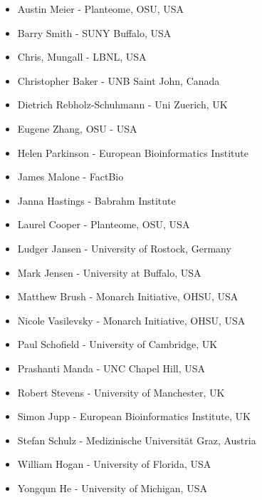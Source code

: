 \documentclass{article}
\begin{document}
\begin{itemize}
\item Austin Meier - Planteome, OSU, USA 
\item Barry Smith - SUNY Buffalo, USA 
\item Chris, Mungall - LBNL, USA 
\item Christopher Baker - UNB Saint John, Canada
\item Dietrich Rebholz-Schuhmann - Uni Zuerich, UK
\item Eugene Zhang, OSU - USA 
\item Helen Parkinson - European Bioinformatics Institute 
\item James Malone - FactBio
\item Janna Hastings - Babrahm Institute 
\item Laurel Cooper - Planteome, OSU, USA
\item Ludger Jansen - University of Rostock, Germany 
\item Mark Jensen - University at Buffalo, USA
\item Matthew Brush - Monarch Initiative, OHSU, USA 
\item Nicole Vasilevsky - Monarch Initiative, OHSU, USA 
\item Paul Schofield - University of Cambridge, UK 
\item Prashanti Manda - UNC Chapel Hill, USA 
\item Robert Stevens - University of Manchester, UK 
\item Simon Jupp - European Bioinformatics Institute, UK
\item Stefan Schulz - Medizinische Universität Graz, Austria
\item William Hogan - University of Florida, USA
\item Yongqun He - University of Michigan, USA
\end{itemize}
\end{document}
